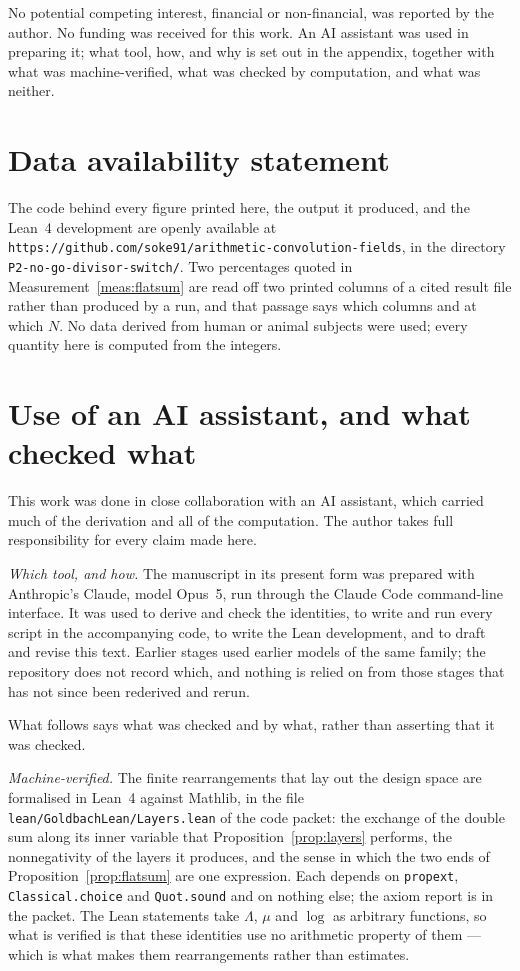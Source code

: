 \documentclass[11pt,a4paper]{article}
\theoremstyle{plain}
\theoremstyle{definition}
\theoremstyle{remark}
\begin{document}
No potential competing interest, financial or non-financial, was
reported by the author. No funding was received for this work. An AI
assistant was used in preparing it; what tool, how, and why is set out
in the appendix, together with what was machine-verified, what was
checked by computation, and what was neither.

\section*{Data availability statement}

The code behind every figure printed here, the output it produced, and
the Lean~4 development are openly available at
\texttt{https://github.com/soke91/arithmetic-convolution-fields}, in the
directory \texttt{P2-no-go-divisor-switch/}. Two percentages quoted in
Measurement~\ref{meas:flatsum} are read off two printed columns of a
cited result file rather than produced by a run, and that passage says
which columns and at which $N$. No data derived from human or animal
subjects were used; every quantity here is computed from the integers.

\appendix
\section{Use of an AI assistant, and what checked what}

This work was done in close collaboration with an AI assistant, which
carried much of the derivation and all of the computation. The author
takes full responsibility for every claim made here.

\emph{Which tool, and how.} The manuscript in its present form was
prepared with Anthropic's Claude, model Opus~5, run through the Claude
Code command-line interface. It was used to derive and check the
identities, to write and run every script in the accompanying code, to
write the Lean development, and to draft and revise this text. Earlier
stages used earlier models of the same family; the repository does not
record which, and nothing is relied on from those stages that has not
since been rederived and rerun.

What follows says what was checked and by what, rather than asserting
that it was checked.

\emph{Machine-verified.} The finite rearrangements that lay out the
design space are formalised in Lean~4 against Mathlib, in the file
\texttt{lean/GoldbachLean/Layers.lean} of the code packet: the exchange
of the double sum along its inner variable that
Proposition~\ref{prop:layers} performs, the nonnegativity of the layers
it produces, and the sense in which the two ends of
Proposition~\ref{prop:flatsum} are one expression. Each depends on
\texttt{propext}, \texttt{Classical.choice} and \texttt{Quot.sound} and
on nothing else; the axiom report is in the packet. The Lean statements
take $\Lambda$, $\mu$ and $\log$ as arbitrary functions, so what is
verified is that these identities use no arithmetic property of them ---
which is what makes them rearrangements rather than estimates.
\end{document}
